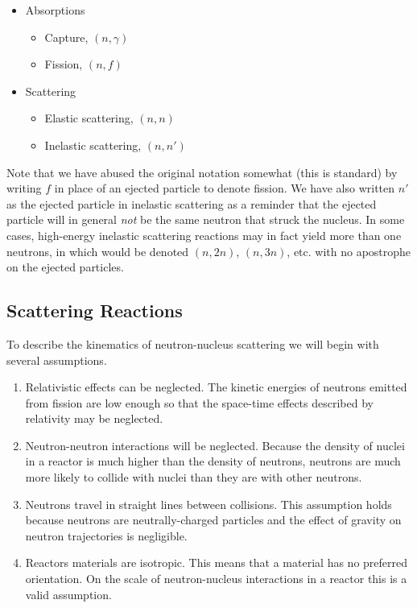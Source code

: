 \documentclass[11pt]{article}
\begin{document}
\begin{itemize}
\item Absorptions
\begin{itemize}
\item Capture, \((n,\gamma)\)
\item Fission, \((n,f)\)
\end{itemize}
\item Scattering
\begin{itemize}
\item Elastic scattering, \((n,n)\)
\item Inelastic scattering, \((n,n')\)
\end{itemize}
\end{itemize}

Note that we have abused the original notation somewhat (this is standard) by writing \(f\) in place of an ejected particle to denote fission.  We have also written \(n'\) as the ejected particle in inelastic scattering as a reminder that the ejected particle will in general \emph{not} be the same neutron that struck the nucleus.  In some cases, high-energy inelastic scattering reactions may in fact yield more than one neutrons, in which would be denoted \((n,2n)\), \((n,3n)\), etc. with no apostrophe on the ejected particles.

\subsection{Scattering Reactions}
\label{sec:orgheadline9}
To describe the kinematics of neutron-nucleus scattering we will begin with several assumptions.
\begin{enumerate}
\item Relativistic effects can be neglected.  The kinetic energies of neutrons emitted from fission are low enough so that the space-time effects described by relativity may be neglected.
\item Neutron-neutron interactions will be neglected.  Because the density of nuclei in a reactor is much higher than the density of neutrons, neutrons are much more likely to collide with nuclei than they are with other neutrons.
\item Neutrons travel in straight lines between collisions.  This assumption holds because neutrons are neutrally-charged particles and the effect of gravity on neutron trajectories is negligible.
\item Reactors materials are isotropic.  This means that a material has no preferred orientation.  On the scale of neutron-nucleus interactions in a reactor this is a valid assumption.
\end{enumerate}
\end{document}
